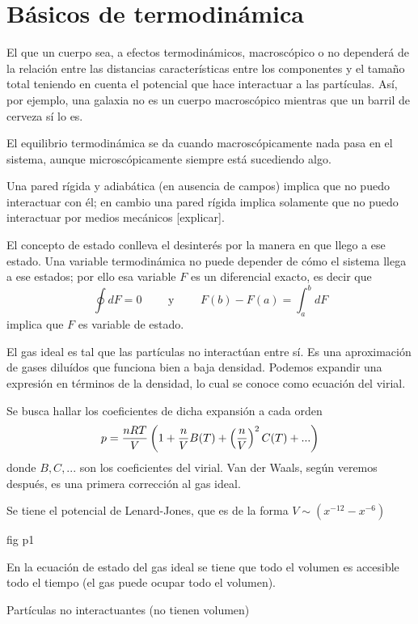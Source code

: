\documentclass[10pt,oneside]{CBFT_book}
\begin{document}
\chapter{Básicos de termodinámica}

El que un cuerpo sea, a efectos termodinámicos, macroscópico o no dependerá de la relación entre las 
distancias características entre los componentes y el tamaño total teniendo en cuenta el potencial que 
hace interactuar a las partículas.
Así, por ejemplo, una galaxia no es un cuerpo macroscópico mientras que un barril de cerveza sí lo es.

El equilibrio termodinámica se da cuando macroscópicamente nada pasa en el sistema, aunque microscópicamente
siempre está sucediendo algo.

Una pared rígida y adiabática (en ausencia de campos) implica que no puedo interactuar con él; en cambio una 
pared rígida implica solamente que no puedo interactuar por medios mecánicos [explicar].

El concepto de estado conlleva el desinterés por la manera en que llego a ese estado. Una variable 
termodinámica no puede depender de cómo el sistema llega a ese estados; por ello esa variable $F$ es un
diferencial exacto, es decir que
\[
	\oint dF = 0 \qquad \text{ y } \qquad F(b)-F(a) = \int_a^b dF
\]
implica que $F$ es variable de estado.

El gas ideal es tal que las partículas no interactúan entre sí. Es una aproximación de gases diluídos que
funciona bien a baja densidad.
Podemos expandir una expresión en términos de la densidad, lo cual se conoce como ecuación del virial.

Se busca hallar los coeficientes de dicha expansión a cada orden
\[
	p = \frac{nRT}{V}\left( 1 + \frac{n}{V} B(T) + \left( \frac{ n }{ V } \right)^2 C(T) + ... \right)
\]
donde $B,C,...$ son los coeficientes del virial.
Van der Waals, según veremos después, es una primera corrección al gas ideal.

Se tiene el potencial de Lenard-Jones, que es de la forma $V \sim (x^{-12} - x^{-6} ) $

fig p1

En la ecuación de estado del gas ideal se tiene que todo el volumen es accesible todo el tiempo (el gas
puede ocupar todo el volumen).

Partículas no interactuantes (no tienen volumen)
\end{document}
